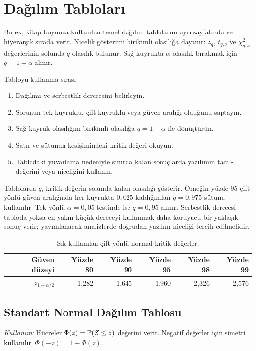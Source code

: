 \chapter{Dağılım Tabloları}
\label{app:distribution-tables}
Bu ek, kitap boyunca kullanılan temel dağılım tablolarını ayrı sayfalarda ve
hiyerarşik sırada verir. Nicelik gösterimi birikimli olasılığa dayanır:
$z_q$, $t_{q,\nu}$ ve $\chi^2_{q,\nu}$ değerlerinin solunda $q$ olasılık
bulunur. Sağ kuyrukta $\alpha$ olasılık bırakmak için $q=1-\alpha$ alınır.

\begin{prismbox}[PrismLight]{Tabloyu kullanma sırası}
\begin{enumerate}
  \item Dağılımı ve serbestlik derecesini belirleyin.
  \item Sorunun tek kuyruklu, çift kuyruklu veya güven aralığı olduğunu saptayın.
  \item Sağ kuyruk olasılığını birikimli olasılığa $q=1-\alpha$ ile dönüştürün.
  \item Satır ve sütunun kesişimindeki kritik değeri okuyun.
  \item Tablodaki yuvarlama nedeniyle sınırda kalan sonuçlarda yazılımın tam
  \pval-değerini veya niceliğini kullanın.
\end{enumerate}
\end{prismbox}

Tablolarda $q$, kritik değerin solunda kalan olasılığı gösterir. Örneğin
yüzde 95 çift yönlü güven aralığında her kuyrukta $0{,}025$ kaldığından
$q=0{,}975$ sütunu kullanılır. Tek yönlü $\alpha=0{,}05$ testinde ise
$q=0{,}95$ alınır. Serbestlik derecesi tabloda yoksa en yakın küçük dereceyi
kullanmak daha koruyucu bir yaklaşık sonuç verir; yayımlanacak analizlerde
doğrudan yazılım niceliği tercih edilmelidir.

\begin{table}[H]
\centering
\caption{Sık kullanılan çift yönlü normal kritik değerler.}
\label{tab:common-z-critical}
\begin{tabular}{rrrrrr}
\toprule
Güven düzeyi & Yüzde 80 & Yüzde 90 & Yüzde 95 & Yüzde 98 & Yüzde 99 \\
\midrule
$z_{1-\alpha/2}$ & 1,282 & 1,645 & 1,960 & 2,326 & 2,576 \\
\bottomrule
\end{tabular}
\end{table}


\clearpage
\section{Standart Normal Dağılım Tablosu}
\label{sec:normal-table}
\textit{Kullanım:} Hücreler $\Phi(z)=\P(Z\le z)$ değerini verir. Negatif değerler için simetri kullanılır: $\Phi(-z)=1-\Phi(z)$.

